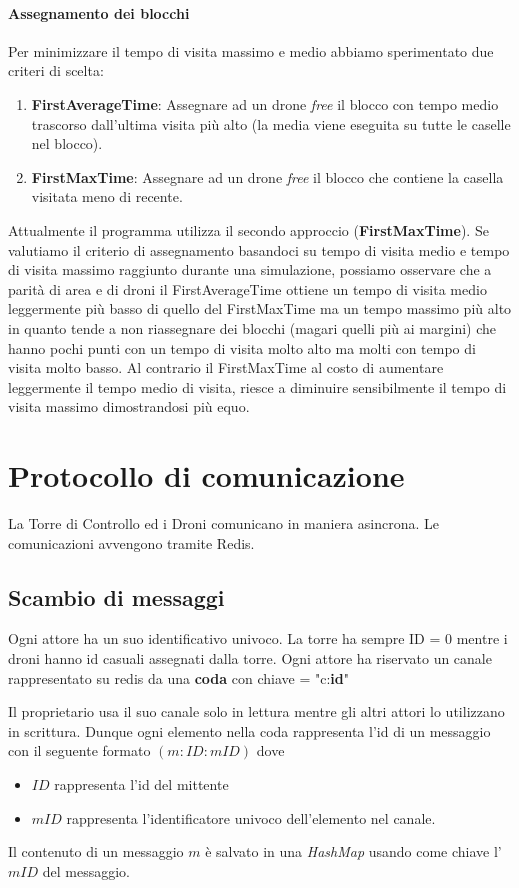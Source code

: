 \documentclass[a4paper, 11pt]{article}
\begin{document}
\paragraph*{Assegnamento dei blocchi}
Per minimizzare il tempo di visita massimo e medio abbiamo sperimentato due criteri di scelta:
\begin{enumerate}
    \item \textbf{FirstAverageTime}: Assegnare ad un drone \textit{free} il blocco con tempo medio trascorso dall'ultima visita più alto (la media viene eseguita su tutte le caselle nel blocco).
    
    \item \textbf{FirstMaxTime}: Assegnare ad un drone \textit{free} il blocco che contiene la casella visitata meno di recente.
\end{enumerate}
Attualmente il programma utilizza il secondo approccio (\textbf{FirstMaxTime}). Se valutiamo il criterio di assegnamento basandoci su tempo di visita medio e tempo di visita massimo raggiunto durante una simulazione, 
possiamo osservare che a parità di area e di droni il FirstAverageTime ottiene un tempo di visita medio leggermente più basso di quello del FirstMaxTime ma un tempo massimo più alto in quanto tende a non riassegnare dei blocchi (magari quelli più ai margini) che hanno pochi punti con un tempo di visita molto alto ma molti con tempo di visita molto basso.
Al contrario il FirstMaxTime al costo di aumentare leggermente il tempo medio di visita, riesce a diminuire sensibilmente il tempo di visita massimo dimostrandosi più equo.  


\section{Protocollo di comunicazione}
La Torre di Controllo ed i Droni comunicano in maniera asincrona. Le comunicazioni avvengono tramite Redis.
\subsection{Scambio di messaggi}

Ogni attore ha un suo identificativo univoco. La torre ha sempre ID = 0 mentre i droni hanno id casuali assegnati dalla torre. 
Ogni attore ha riservato un canale rappresentato su redis da una \textbf{coda} con chiave = "c:\textbf{id}"

Il proprietario usa il suo canale solo in lettura mentre gli altri attori lo utilizzano in scrittura.
Dunque ogni elemento nella coda rappresenta l'id di un messaggio con il seguente formato $(m:ID:mID)$ dove
\begin{itemize}
    \item $ID$ rappresenta l'id del mittente
    \item $mID$ rappresenta l'identificatore univoco dell'elemento nel canale.
\end{itemize}
Il contenuto di un messaggio $m$ è salvato in una \textit{HashMap} usando come chiave l'$mID$ del messaggio.
\end{document}
